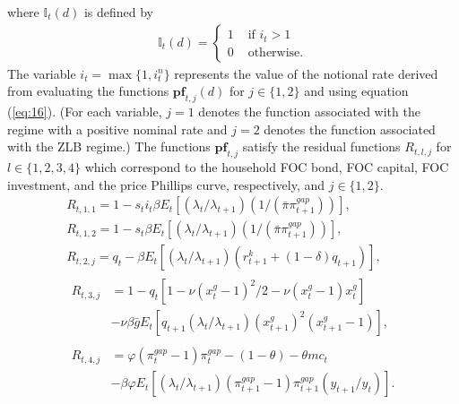 \documentclass[12pt, final]{article}
\begin{document}
where $\mathds{I}_t(d)$ is defined by
\begin{gather}
    \label{eq:19}
  \mathds{I}_t(d) = 
\begin{cases}
     1 &\text{ if } i_t > 1\\
     0 &\text{ otherwise.}
\end{cases}
\end{gather}
The variable $i_t=\max\{1,i_t^n\}$ represents the value of the notional rate derived from evaluating the functions $\textbf{pf}_{t,j}(d)$ for $j \in \{1,2\}$ and using equation (\ref{eq:16}). (For each variable, $j=1$ denotes the function associated with the regime with a positive nominal rate and $j=2$ denotes the function associated with the ZLB regime.) %
The functions $\textbf{pf}_{t,j}$ satisfy the residual functions $R_{t,l,j}$ for $l \in \{1,2,3,4\}$ which correspond to the household FOC bond, FOC capital, FOC investment, and the price Phillips curve, respectively, and $j \in \{1,2\}$.
\begin{gather}
\label{eq:20}
  R_{t,1,1} = 1 - s_ti_t\beta E_t[(\lambda_t/\lambda_{t+1})(1/(\bar{\pi}\pi_{t+1}^{gap}))],\\
\label{eq:21}
  R_{t,1,2} = 1 - s_t\beta E_t[(\lambda_t/\lambda_{t+1})(1/(\bar{\pi}\pi_{t+1}^{gap}))],\\
\label{eq:22}
R_{t,2,j} = q_t - \beta E_t[(\lambda_t/\lambda_{t+1})(r^k_{t+1}+(1-\delta)q_{t+1})],\\
 \label{eq:23} 
  \begin{split}
    R_{t,3,j} &= 1 - q_t[1-\nu(x^g_t-1)^2/2 - \nu(x_t^g-1)x_t^g] \\&- \nu\beta\bar{g}E_t[q_{t+1}(\lambda_t/\lambda_{t+1})(x^g_{t+1})^2(x^g_{t+1}-1)], 
  \end{split}
  \\
   \label{eq:24}
  \begin{split}
    R_{t,4,j} &= \varphi(\pi_t^{gap}-1)\pi_t^{gap} - (1-\theta) - \theta mc_t \\&- \beta\varphi E_t[(\lambda_t/\lambda_{t+1})(\pi_{t+1}^{gap}-1)\pi_{t+1}^{gap}(y_{t+1}/y_t)].
    \end{split}
  \end{gather}
\end{document}
